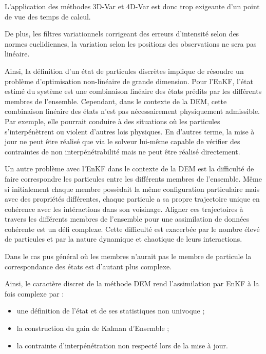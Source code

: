 L'application des méthodes 3D-Var et 4D-Var est donc trop exigeante d'un point de vue des temps de calcul.

De plus, les filtres variationnels corrigeant des erreurs d'intensité selon des normes euclidiennes, la variation selon les positions des observations ne sera pas linéaire.

Ainsi, la définition d'un état de particules discrètes implique de résoudre un problème d'optimisation non-linéaire de grande dimension.
Pour l'EnKF, l'état estimé du système est une combinaison linéaire des états prédits par les différents membres de l'ensemble. Cependant, dans le contexte de la DEM, cette combinaison linéaire des états n'est pas nécessairement physiquement admissible. Par exemple, elle pourrait conduire à des situations où les particules s'interpénètrent ou violent d'autres lois physiques.
En d'autres terme, la mise à jour ne peut être réalisé que via le solveur lui-même capable de vérifier des contraintes de non interpénétrabilité mais ne peut être réalisé directement.

Un autre problème avec l'EnKF dans le contexte de la DEM est la difficulté de faire correspondre les particules entre les différents membres de l'ensemble. Même si initialement chaque membre possèdait la même configuration particulaire mais avec des propriétés différentes, chaque particule a sa propre trajectoire unique en cohérence avec les intéractions dans son voisinage. Aligner ces trajectoires à travers les différents membres de l'ensemble pour une assimilation de données cohérente est un défi complexe. Cette difficulté est exacerbée par le nombre élevé de particules et par la nature dynamique et chaotique de leurs interactions.

Dans le cas pus général où les membres n'aurait pas le membre de particule la correspondance des états est d'autant plus complexe.

Ainsi, le caractère discret de la méthode DEM rend l'assimilation par EnKF à la fois complexe par :

\begin{itemize}
    \item une définition de l'état et de ses statistiques non univoque ;
    \item la construction du gain de Kalman d'Ensemble ;
    \item la contrainte d'interpénétration non respecté lors de la mise à jour.
\end{itemize}

